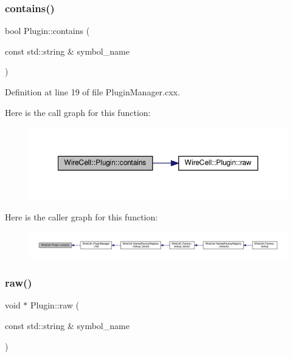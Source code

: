 \subsubsection{\texorpdfstring{contains()}{contains()}}
{\footnotesize\ttfamily bool Plugin\+::contains (\begin{DoxyParamCaption}\item[{const std\+::string \&}]{symbol\+\_\+name }\end{DoxyParamCaption})}



Definition at line 19 of file Plugin\+Manager.\+cxx.

Here is the call graph for this function\+:
\nopagebreak
\begin{figure}[H]
\begin{center}
\leavevmode
\includegraphics[width=350pt]{class_wire_cell_1_1_plugin_ab8f49d4beba0924fa53ba45ec54ad649_cgraph}
\end{center}
\end{figure}
Here is the caller graph for this function\+:
\nopagebreak
\begin{figure}[H]
\begin{center}
\leavevmode
\includegraphics[width=350pt]{class_wire_cell_1_1_plugin_ab8f49d4beba0924fa53ba45ec54ad649_icgraph}
\end{center}
\end{figure}
\mbox{\label{class_wire_cell_1_1_plugin_a6532d3eb05241c25780a18194cd6572f}} 
\subsubsection{\texorpdfstring{raw()}{raw()}}
{\footnotesize\ttfamily void $\ast$ Plugin\+::raw (\begin{DoxyParamCaption}\item[{const std\+::string \&}]{symbol\+\_\+name }\end{DoxyParamCaption})}



